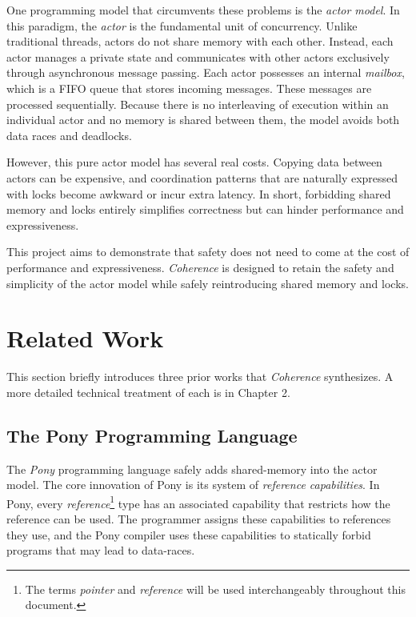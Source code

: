 One programming model that circumvents these problems is the \textit{actor model}. In this paradigm, the \textit{actor} is the fundamental unit of concurrency. Unlike traditional threads, actors do not share memory with each other. Instead, each actor manages a private state and communicates with other actors exclusively through asynchronous message passing. Each actor possesses an internal \textit{mailbox}, which is a FIFO queue that stores incoming messages. These messages are processed sequentially. Because there is no interleaving of execution within an individual actor and no memory is shared between them, the model avoids both data races and deadlocks.

However, this pure actor model has several real costs. Copying data between actors can be expensive, and coordination patterns that are naturally expressed with locks become awkward or incur extra latency. In short, forbidding shared memory and locks entirely simplifies correctness but can hinder performance and expressiveness.

This project aims to demonstrate that safety does not need to come at the cost of performance and expressiveness. \textit{Coherence} is designed to retain the safety and simplicity of the actor model while safely reintroducing shared memory and locks.

\section{Related Work} \label{sec:related_work}

This section briefly introduces three prior works that \textit{Coherence} synthesizes. A more detailed technical treatment of each is in Chapter 2.

\subsection{The Pony Programming Language}
The \textit{Pony} programming language\cite{pony_language} safely adds shared-memory into the actor model. The core innovation of Pony is its system of \textit{reference capabilities}. In Pony, every \textit{reference}\footnote{The terms \textit{pointer} and \textit{reference} will be used interchangeably throughout this document.} type has an associated capability that restricts how the reference can be used. The programmer assigns these capabilities to references they use, and the Pony compiler uses these capabilities to statically forbid programs that may lead to data-races. 


